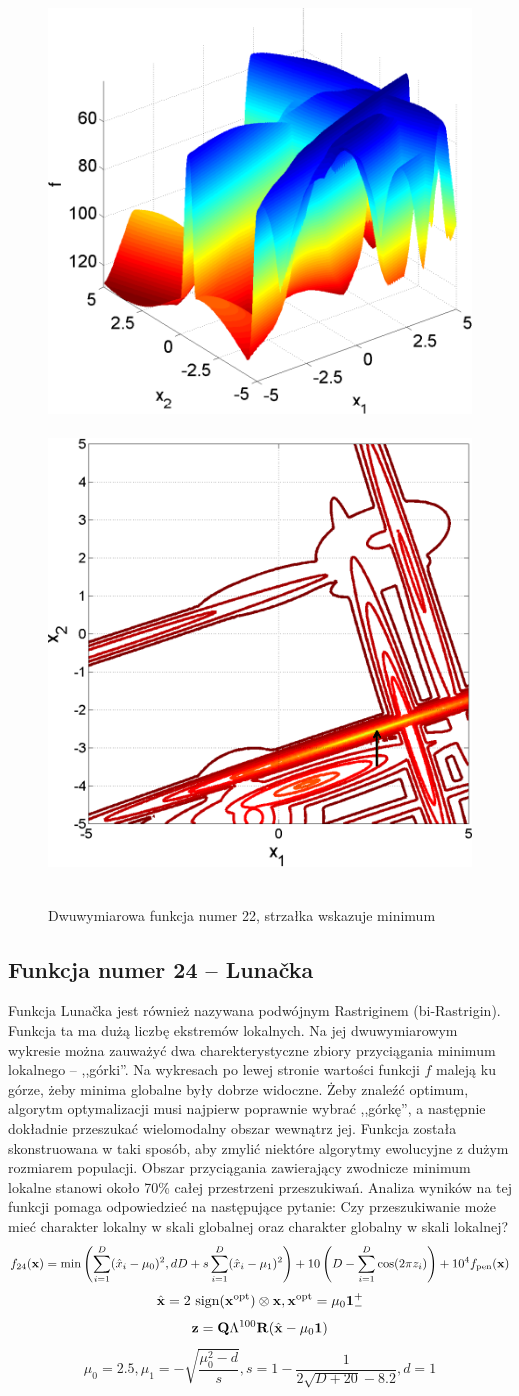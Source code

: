 \documentclass[a4paper,onecolumn,oneside,12pt,wide,floatssmall]{mwrep}
\theoremstyle{definition}
\theoremstyle{plain}%
\theoremstyle{remark}
\begin{document}
\begin{figure}[H]
\centering
\mbox{
\includegraphics[width=.45\textwidth]{img/22.png} \quad
\includegraphics[width=.45\textwidth]{img/22a.png} 
}
\caption{Dwuwymiarowa funkcja numer 22, strzałka wskazuje minimum \cite{noiseless}}
\end{figure}

\subsection{Funkcja numer 24 -- Lunačka}

Funkcja Lunačka jest również nazywana podwójnym Rastriginem (bi-Rastrigin). Funkcja ta ma dużą liczbę ekstremów lokalnych. 
Na jej dwuwymiarowym wykresie można zauważyć dwa charekterystyczne zbiory przyciągania 
minimum lokalnego -- ,,górki''. Na wykresach po lewej stronie
wartości funkcji $f$ maleją ku górze, żeby minima globalne były dobrze widoczne.
Żeby znaleźć optimum, algorytm optymalizacji musi najpierw poprawnie wybrać ,,górkę'',
a następnie dokładnie przeszukać wielomodalny obszar wewnątrz jej. Funkcja została skonstruowana w taki sposób, aby zmylić
niektóre algorytmy ewolucyjne z dużym rozmiarem populacji. Obszar przyciągania zawierający zwodnicze
minimum lokalne stanowi około 70\% całej przestrzeni przeszukiwań.
Analiza wyników na tej funkcji pomaga odpowiedzieć na następujące pytanie:
Czy przeszukiwanie może mieć charakter lokalny w skali globalnej oraz charakter globalny w skali lokalnej?
$$ f_{24}(\bold{x}) = \min \left( \sum^D_{i=1}(\hat{x}_i - \mu_0)^2, dD + s \sum^D_{i=1}(\hat{x}_i - \mu_1)^2 \right) + 10 \left( D - \sum^D_{i=1} \cos(2 \pi z_i) \right) + 10^4 f_\text{pen}(\bold{x}) $$
$$ \hat{\bold{x}} = 2 \text{ sign}(\bold{x}^{\text{opt}}) \otimes \bold{x}, \bold{x}^{\text{opt}} = \mu_0 \bold{1}_-^+ $$
$$ \bold{z} = \bold{Q}\Lambda^{100}\bold{R}(\hat{\bold{x}} - \mu_0\bold{1}) $$
$$ \mu_0 = 2.5, \mu_1 = -\sqrt{\frac{\mu_0^2-d}{s}}, s = 1 - \frac{1}{2\sqrt{D+20}-8.2}, d=1 $$
\end{document}
